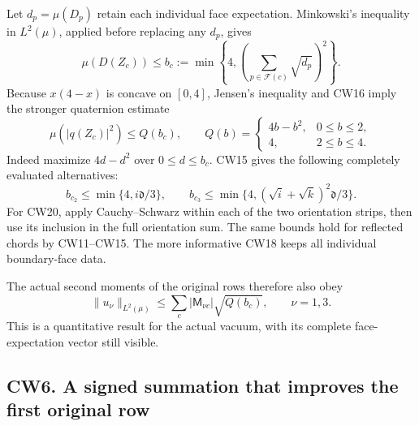 \documentclass[11pt]{article}
\begin{document}
Let \(d_p=\mu(D_p)\) retain each individual face expectation.
Minkowski's inequality in \(L^2(\mu)\), applied before replacing
any \(d_p\), gives
\[
 \mu(D(Z_c))\le b_c:=
 \min\left\{4,\left(\sum_{p\in\mathcal F(c)}\sqrt{d_p}\right)^2\right\}.
                                                               \tag{CW18}
\]
Because \(x(4-x)\) is concave on \([0,4]\), Jensen's inequality
and CW16 imply the stronger quaternion estimate
\[
 \mu(|q(Z_c)|^2)\le Q(b_c),\qquad
 Q(b)=\begin{cases}4b-b^2,&0\le b\le2,\\4,&2\le b\le4.\end{cases}
                                                               \tag{CW19}
\]
Indeed maximize \(4d-d^2\) over \(0\le d\le b_c\).
CW15 gives the following completely evaluated alternatives:
\[
 b_{c_2}\le\min\{4,i\mathfrak d/3\},\qquad
 b_{c_3}\le\min\{4,(\sqrt i+\sqrt k)^2\mathfrak d/3\}.
                                                               \tag{CW20}
\]
For CW20, apply Cauchy–Schwarz within each of the two orientation
strips, then use its inclusion in the full orientation sum. The
same bounds hold for reflected chords by CW11–CW15. The more
informative CW18 keeps all individual boundary-face data.

The actual second moments of the original rows therefore also obey
\[
 \|u_\nu\|_{L^2(\mu)}
 \le\sum_c|\mathsf M_{\nu c}|\sqrt{Q(b_c)},\qquad \nu=1,3.
                                                               \tag{CW21}
\]
This is a quantitative result for the actual vacuum, with its
complete face-expectation vector still visible.

\subsection*{CW6. A signed summation that improves the first original row}
\end{document}
